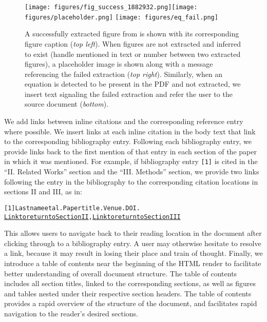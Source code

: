 \begin{figure}
    \centering
    \texttt{[image: figures/fig\_success\_1882932.png]}\texttt{[image: figures/placeholder.png]}
    \texttt{[image: figures/eq\_fail.png]}
    \caption{A successfully extracted figure from \citet{Nascimento2005VertexCA} is shown with its corresponding figure caption (\textit{top left}). When figures are not extracted and inferred to exist (handle mentioned in text or number between two extracted figures), a placeholder image is shown along with a message referencing the failed extraction (\textit{top right}). Similarly, when an equation is detected to be present in the PDF and not extracted, we insert text signaling the failed extraction and refer the user to the source document (\textit{bottom}).}
    \label{fig:figure_equations}
\end{figure}

We add links between inline citations and the corresponding reference entry where possible. We insert links at each inline citation in the body text that link to the corresponding bibliography entry. Following each bibliography entry, we provide links back to the first mention of that entry in each section of the paper in which it was mentioned. For example, if bibliography entry \texttt{[1]} is cited in the ``II. Related Works'' section and the ``III. Methods'' section, we provide two links following the entry in the bibliography to the corresponding citation locations in sections II and III, as in:

\begin{alltt}
    [1] Last name et al. Paper title. Venue. DOI.
        \underline{Link to return to Section II}, \underline{Link to return to Section III}
\end{alltt}

\noindent This allows users to navigate back to their reading location in the document after clicking through to a bibliography entry. A user may otherwise hesitate to resolve a link, because it may result in losing their place and train of thought. Finally, we introduce a table of contents near the beginning of the HTML render to facilitate better understanding of overall document structure. The table of contents includes all section titles, linked to the corresponding sections, as well as figures and tables nested under their respective section headers. The table of contents provides a rapid overview of the structure of the document, and facilitates rapid navigation to the reader's desired sections.

